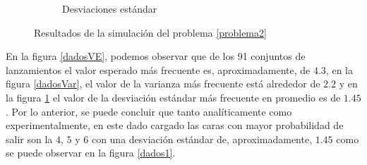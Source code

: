 \documentclass{article}
\begin{document}
\begin{figure}[htp]
\begin{center}
\begin{subfigure}{0.45\textwidth}
        \caption{Desviaciones estándar}
        \label{dadosDesv}
    \end{subfigure}
    \caption{Resultados de la simulación del problema \ref{problema2}}
    \label{dados}
    \end{center}
\end{figure}

En la figura \ref{dadosVE}, podemos observar que de los 91 conjuntos de lanzamientos el valor esperado más frecuente es, aproximadamente, de $4.3$, en la figura \ref{dadosVar}, el valor de la varianza más frecuente está alrededor de $2.2$ y en la figura \ref{dadosDesv} el valor de la desviación estándar más frecuente en promedio es de $1.45$. Por lo anterior, se puede concluir que tanto analíticamente como experimentalmente, en este dado cargado las caras con mayor probabilidad de salir son la $4$, $5$ y $6$ con una desviación estándar de, aproximadamente, $1.45$ como se puede observar en la figura \ref{dados1}.
\end{document}
